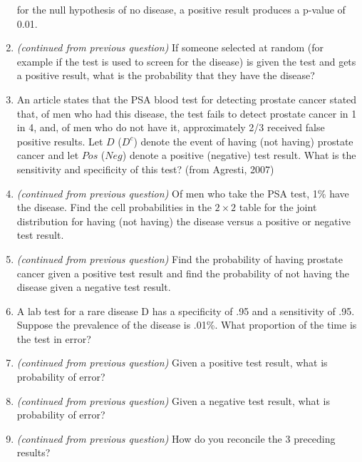 \documentclass[
]{article}
\begin{document}
\begin{enumerate}
  for the null hypothesis of no disease, a positive result produces a
  p-value of 0.01. \vspace{0px}
\item
  \emph{(continued from previous question)} If someone selected at
  random (for example if the test is used to screen for the disease) is
  given the test and gets a positive result, what is the probability
  that they have the disease? \vspace{0px}
\item
  An article states that the PSA blood test for detecting prostate
  cancer stated that, of men who had this disease, the test fails to
  detect prostate cancer in 1 in 4, and, of men who do not have it,
  approximately 2/3 received false positive results. Let \(D\) (\(D^c\))
  denote the event of having (not having) prostate cancer and let
  \(Pos\) (\(Neg\)) denote a positive (negative) test result. What is
  the sensitivity and specificity of this test? (from Agresti, 2007)
  \vspace{0px}
\item
  \emph{(continued from previous question)} Of men who take the PSA
  test, 1\% have the disease. Find the cell probabilities in the
  \(2 \times 2\) table for the joint distribution for having (not
  having) the disease versus a positive or negative test result.
  \vspace{0px}
\item
  \emph{(continued from previous question)} Find the probability of
  having prostate cancer given a positive test result and find the
  probability of not having the disease given a negative test result.
  \vspace{0px}
\item
  A lab test for a rare disease D has a specificity of .95 and a
  sensitivity of .95. Suppose the prevalence of the disease is .01\%.
  What proportion of the time is the test in error? \vspace{0px}
\item
  \emph{(continued from previous question)} Given a positive test
  result, what is probability of error? \vspace{0px}
\item
  \emph{(continued from previous question)} Given a negative test
  result, what is probability of error? \vspace{0px}
\item
  \emph{(continued from previous question)} How do you reconcile the 3
  preceding results? \vspace{0px}

\end{enumerate}
\end{document}
